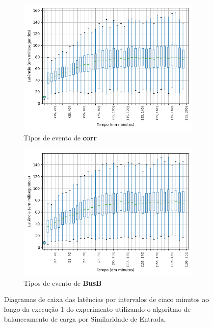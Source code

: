 \begin{figure}
\begin{subfigure}{.5\textwidth}
\centering
\includegraphics[width=\textwidth]{figuras/graphics/boxplot_6-dez-is_corr.png}
\caption{Tipos de evento de \textbf{corr}}
\label{fig:BoxPlot_corr_IS_1}
\end{subfigure}%
\begin{subfigure}{.5\textwidth}
\centering
\includegraphics[width=\textwidth]{figuras/graphics/boxplot_6-dez-is_busb.png}
\caption{Tipos de evento de \textbf{BusB}}
\label{fig:BoxPlot_BusB_IS_1}
\end{subfigure}%
\caption{Diagramas de caixa das latências por intervalos de cinco minutos ao longo da execução 1 do experimento utilizando o algoritmo de balanceamento de carga por Similaridade de Entrada.}
\end{figure}




